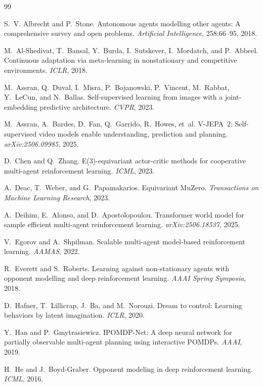 \documentclass[11pt]{article}
\begin{document}
\begin{thebibliography}{99}
\small

 S.~V. Albrecht and P.~Stone. Autonomous agents modelling
other agents: A comprehensive survey and open problems. \emph{Artificial
Intelligence}, 258:66--95, 2018.

 M.~Al-Shedivat, T.~Bansal, Y.~Burda, I.~Sutskever,
I.~Mordatch, and P.~Abbeel. Continuous adaptation via meta-learning in
nonstationary and competitive environments. \emph{ICLR}, 2018.

 M.~Assran, Q.~Duval, I.~Misra, P.~Bojanowski, P.~Vincent,
M.~Rabbat, Y.~LeCun, and N.~Ballas. Self-supervised learning from images with a
joint-embedding predictive architecture. \emph{CVPR}, 2023.

 M.~Assran, A.~Bardes, D.~Fan, Q.~Garrido, R.~Howes,
et~al. V-JEPA~2: Self-supervised video models enable understanding, prediction
and planning. \emph{arXiv:2506.09985}, 2025.

 D.~Chen and Q.~Zhang. E(3)-equivariant actor-critic methods for
cooperative multi-agent reinforcement learning. \emph{ICML}, 2023.

 A.~Deac, T.~Weber, and G.~Papamakarios. Equivariant
MuZero. \emph{Transactions on Machine Learning Research}, 2023.

 A.~Deihim, E.~Alonso, and D.~Apostolopoulou.
Transformer world model for sample efficient multi-agent reinforcement learning.
\emph{arXiv:2506.18537}, 2025.

 V.~Egorov and A.~Shpilman. Scalable multi-agent model-based
reinforcement learning. \emph{AAMAS}, 2022.

 R.~Everett and S.~Roberts. Learning against non-stationary
agents with opponent modelling and deep reinforcement learning. \emph{AAAI Spring
Symposia}, 2018.

 D.~Hafner, T.~Lillicrap, J.~Ba, and M.~Norouzi. Dream to
control: Learning behaviors by latent imagination. \emph{ICLR}, 2020.

 Y.~Han and P.~Gmytrasiewicz. IPOMDP-Net: A deep neural network
for partially observable multi-agent planning using interactive POMDPs.
\emph{AAAI}, 2019.

 H.~He and J.~Boyd-Graber. Opponent modeling in deep reinforcement
learning. \emph{ICML}, 2016.


\end{thebibliography}
\end{document}

